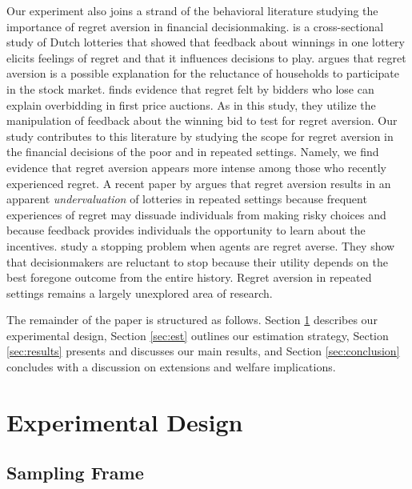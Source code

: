 \documentclass[11pt]{article}
\begin{document}
	Our experiment also joins a strand of the behavioral literature studying the importance of regret aversion in financial decisionmaking. \textcite{zeelenberg_consequences_2004} is a cross-sectional study of Dutch lotteries that showed that feedback about winnings in one lottery elicits feelings of regret and that it influences decisions to play. \textcite{barberis_individual_2006} argues that regret aversion is a possible explanation for the reluctance of households to participate in the stock market. \textcite{filiz-ozbay_auctions_2007} finds evidence that regret felt by bidders who lose can explain overbidding in first price auctions. As in this study, they utilize the manipulation of feedback about the winning bid to test for regret aversion. Our study contributes to this literature by studying the scope for regret aversion in the financial decisions of the poor and in repeated settings. Namely, we find evidence that regret aversion appears more intense among those who recently experienced regret. A recent paper by \textcite{imas_regret_2016} argues that regret aversion results in an apparent \emph{undervaluation} of lotteries in repeated settings because frequent experiences of regret may dissuade individuals from making risky choices and because feedback provides individuals the opportunity to learn about the incentives. \textcite{strack_too_2019} study a stopping problem when agents are regret averse. They show that decisionmakers are reluctant to stop because their utility depends on the best foregone outcome from the entire history. Regret aversion in repeated settings remains a largely unexplored area of research.

	The remainder of the paper is structured as follows. Section \ref{sec:design} describes our experimental design, Section \ref{sec:est} outlines our estimation strategy, Section \ref{sec:results} presents and discusses our main results, and Section \ref{sec:conclusion} concludes with a discussion on extensions and welfare implications.

\section{Experimental Design} \label{sec:design}

	\subsection{Sampling Frame}
\end{document}
